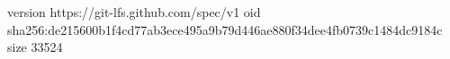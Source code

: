 version https://git-lfs.github.com/spec/v1
oid sha256:de215600b1f4cd77ab3ece495a9b79d446ae880f34dee4fb0739c1484dc9184c
size 33524
